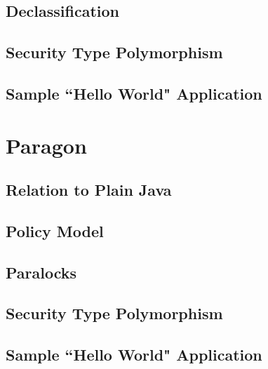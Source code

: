 \subsection{Declassification}

\subsection{Security Type Polymorphism}

\subsection{Sample ``Hello World" Application}

\section{Paragon}

\subsection{Relation to Plain Java}

\subsection{Policy Model}

\subsection{Paralocks}

\subsection{Security Type Polymorphism}

\subsection{Sample ``Hello World" Application}